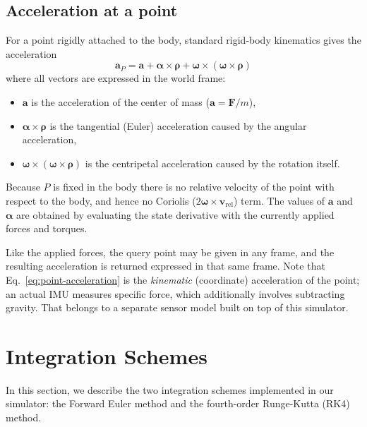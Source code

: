 \documentclass{article}
\begin{document}
\subsection{Acceleration at a point}

For a point rigidly attached to the body, standard rigid-body kinematics gives the acceleration
\begin{equation}
	\mathbf{a}_P = \mathbf{a} + \boldsymbol{\alpha} \times \boldsymbol{\rho} + \boldsymbol{\omega} \times \left( \boldsymbol{\omega} \times \boldsymbol{\rho} \right)
	\label{eq:point-acceleration}
\end{equation}
where all vectors are expressed in the world frame:
\begin{itemize}
	\item $\mathbf{a}$ is the acceleration of the center of mass ($\mathbf{a} = \mathbf{F}/m$),
	\item $\boldsymbol{\alpha} \times \boldsymbol{\rho}$ is the tangential (Euler) acceleration caused by the angular acceleration,
	\item $\boldsymbol{\omega} \times (\boldsymbol{\omega} \times \boldsymbol{\rho})$ is the centripetal acceleration caused by the rotation itself.
\end{itemize}
Because $P$ is fixed in the body there is no relative velocity of the point with respect to the body, and hence no Coriolis ($2\boldsymbol{\omega}\times\mathbf{v}_{\text{rel}}$) term. The values of $\mathbf{a}$ and $\boldsymbol{\alpha}$ are obtained by evaluating the state derivative with the currently applied forces and torques.

Like the applied forces, the query point may be given in any frame, and the resulting acceleration is returned expressed in that same frame. Note that Eq.~\eqref{eq:point-acceleration} is the \emph{kinematic} (coordinate) acceleration of the point; an actual IMU measures specific force, which additionally involves subtracting gravity. That belongs to a separate sensor model built on top of this simulator.

\section{Integration Schemes}
\label{sec:integration}
In this section, we describe the two integration schemes implemented in our simulator: the Forward Euler method and the fourth-order Runge-Kutta (RK4) method.
\end{document}
